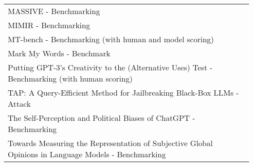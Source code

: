 \documentclass[fleqn]{article}
\begin{document}
\begin{table}[H]
\begin{tabular}{l}
		MASSIVE - Benchmarking \\
		MIMIR - Benchmarking \\
		MT-bench - Benchmarking (with human and model scoring) \\
		Mark My Words - Benchmark \\
		Putting GPT-3's Creativity to the (Alternative Uses) Test - Benchmarking (with human scoring) \\
		TAP: A Query-Efficient Method for Jailbreaking Black-Box LLMs - Attack \\
		The Self-Perception and Political Biases of ChatGPT - Benchmarking \\
		Towards Measuring the Representation of Subjective Global Opinions in Language Models - Benchmarking \\
		\bottomrule
	\end{tabular}
\end{table}	

\pagebreak
\end{document}
